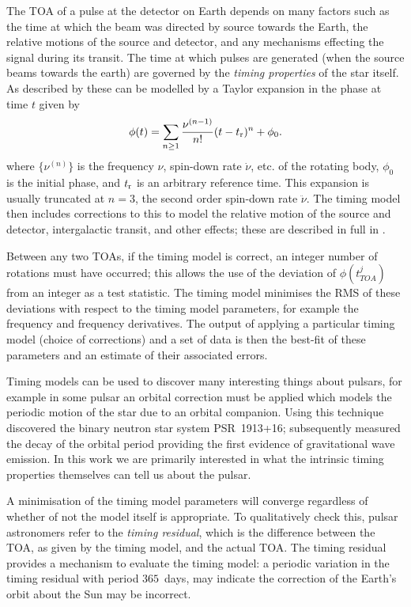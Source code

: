 The TOA of a pulse at the detector on Earth depends on many factors such as the
time at which the beam was directed by source towards the Earth, the relative
motions of the source and detector, and any mechanisms effecting the signal during
its transit. The time at which pulses are generated (when the source beams towards
the earth) are governed by the \emph{timing properties} of the star itself.
As described by \citet{Edwards2006} these can be modelled by a Taylor expansion
in the phase at time $t$ given by
\begin{equation}
\phi(t) = \sum_{n\ge 1}\frac{\nu^{(n-1)}}{n!}(t - t_{\textrm{r}})^{n} + \phi_{0}.
\label{eqn: Taylor compact}
\end{equation} 
where $\{\nu^{(n)}\}$ is the frequency $\nu$, spin-down rate $\dot{\nu}$, etc.
of the rotating body, $\phi_0$ is the initial phase, and $t_{\textrm{r}}$ is an
arbitrary reference time. This expansion is usually truncated at $n=3$, the
second order spin-down rate $\ddot{\nu}$. The timing model then includes
corrections to this to model the relative motion of the source and detector,
intergalactic transit, and other effects; these are described in full in
\citet{Edwards2006}. 

Between any two TOAs, if the timing model is correct, an integer number of
rotations must have occurred; this allows the use of the deviation of
$\phi(t_{TOA}^{j})$ from an integer as a test statistic. The timing model
minimises the RMS of these deviations with respect to the timing model
parameters, for example the frequency and frequency derivatives. The output of
applying a particular timing model (choice of corrections) and a set of data is
then the best-fit of these parameters and an estimate of their associated errors.

Timing models can be used to discover many interesting things about pulsars,
for example in some pulsar an orbital correction must be applied which models
the periodic motion of the star due to an orbital companion. Using this
technique \citet{Hulse1975} discovered the binary neutron star system
PSR~1913+16; \citet{Taylor1982} subsequently measured the decay of the orbital
period providing the first evidence of gravitational wave emission. In this
work we are primarily interested in what the intrinsic timing properties
themselves can tell us about the pulsar.

A minimisation of the timing model parameters will converge regardless of
whether of not the model itself is appropriate. To qualitatively check this,
pulsar astronomers refer to the \emph{timing residual}, which is the difference
between the TOA, as given by the timing model, and the actual TOA. The timing
residual provides a mechanism to evaluate the timing model: a periodic
variation in the timing residual with period $365$~days, may indicate the correction
of the Earth's orbit about the Sun may be incorrect.

